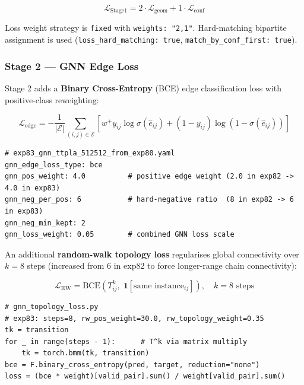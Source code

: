\documentclass[11pt,a4paper]{article}
\begin{document}
\[
\mathcal{L}_{\text{Stage1}} = 2 \cdot \mathcal{L}_{\text{geom}} + 1 \cdot \mathcal{L}_{\text{conf}}
\]

Loss weight strategy is \texttt{fixed} with \texttt{weights: "2,1"}.
Hard-matching bipartite assignment is used (\texttt{loss\_hard\_matching: true},
\texttt{match\_by\_conf\_first: true}).

\subsubsection{Stage 2 --- GNN Edge Loss}

Stage 2 adds a \textbf{Binary Cross-Entropy} (BCE) edge classification loss
with positive-class reweighting:

\[
\mathcal{L}_{\text{edge}} = -\frac{1}{|\mathcal{E}|}
\sum_{(i,j)\in\mathcal{E}} \left[
  w^+ y_{ij} \log \sigma(\hat{e}_{ij}) + (1 - y_{ij}) \log(1 - \sigma(\hat{e}_{ij}))
\right]
\]

\begin{lstlisting}
# exp83_gnn_ttpla_512512_from_exp80.yaml
gnn_edge_loss_type: bce
gnn_pos_weight: 4.0          # positive edge weight (2.0 in exp82 -> 4.0 in exp83)
gnn_neg_per_pos: 6           # hard-negative ratio  (8 in exp82 -> 6 in exp83)
gnn_neg_min_kept: 2
gnn_loss_weight: 0.05        # combined GNN loss scale
\end{lstlisting}

An additional \textbf{random-walk topology loss} regularises global connectivity
over $k=8$ steps (increased from 6 in exp82 to force longer-range chain connectivity):

\[
\mathcal{L}_{\text{RW}} = \text{BCE}\!\left(T^k_{ij},\;
\mathbf{1}[\text{same instance}_{ij}]\right), \quad k=8 \text{ steps}
\]

\begin{lstlisting}
# gnn_topology_loss.py
# exp83: steps=8, rw_pos_weight=30.0, rw_topology_weight=0.35
tk = transition
for _ in range(steps - 1):      # T^k via matrix multiply
    tk = torch.bmm(tk, transition)
bce = F.binary_cross_entropy(pred, target, reduction="none")
loss = (bce * weight)[valid_pair].sum() / weight[valid_pair].sum()
\end{lstlisting}
\end{document}
